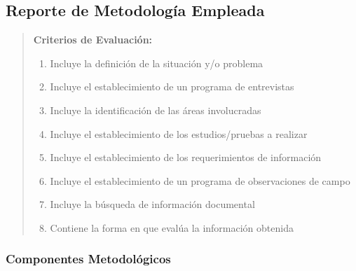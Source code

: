 \documentclass[12pt,letterpaper,oneside]{book}
\newenvironment{criterios}
{\begin{quote}\textbf{Criterios de Evaluación:}\begin{enumerate}}
{\end{enumerate}\end{quote}}
\begin{document}
\subsection{Reporte de Metodología Empleada}

\begin{criterios}
\item Incluye la definición de la situación y/o problema
\item Incluye el establecimiento de un programa de entrevistas
\item Incluye la identificación de las áreas involucradas
\item Incluye el establecimiento de los estudios/pruebas a realizar
\item Incluye el establecimiento de los requerimientos de información
\item Incluye el establecimiento de un programa de observaciones de campo
\item Incluye la búsqueda de información documental
\item Contiene la forma en que evalúa la información obtenida
\end{criterios}

\subsubsection{Componentes Metodológicos}
\end{document}
